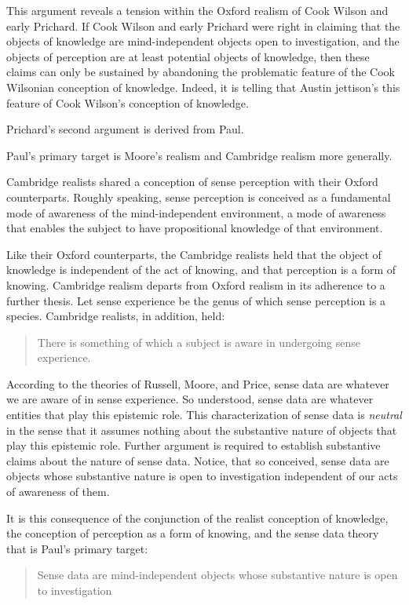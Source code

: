 \documentclass[11pt]{article}
\begin{document}
This argument reveals a tension within the Oxford realism of Cook Wilson and early Prichard. If Cook Wilson and early Prichard were right in claiming that the objects of knowledge are mind-independent objects open to investigation, and the objects of perception are at least potential objects of knowledge, then these claims can only be sustained by abandoning the problematic feature of the Cook Wilsonian conception of knowledge. Indeed, it is telling that Austin jettison's this feature of Cook Wilson's conception of knowledge.

Prichard's second argument is derived from Paul.

Paul's primary target is Moore's realism and Cambridge realism more generally.

Cambridge realists shared a conception of sense perception with their Oxford counterparts. Roughly speaking, sense perception is conceived as a fundamental mode of awareness of the mind-independent environment, a mode of awareness that enables the subject to have propositional knowledge of that environment. 

Like their Oxford counterparts, the Cambridge realists held that the object of knowledge is independent of the act of knowing, and that perception is a form of knowing. Cambridge realism departs from Oxford realism in its adherence to a further thesis. Let sense experience be the genus of which sense perception is a species. Cambridge realists, in addition, held:
\begin{quote}
	There is something of which a subject is aware in undergoing sense experience.
\end{quote}
According to the theories of Russell, Moore, and Price, sense data are whatever we are aware of in sense experience. So understood, sense data are whatever entities that play this epistemic role. This characterization of sense data is \emph{neutral} in the sense that it assumes nothing about the substantive nature of objects that play this epistemic role. Further argument is required to establish substantive claims about the nature of sense data. Notice, that so conceived, sense data are objects whose substantive nature is open to investigation independent of our acts of awareness of them. 

It is this consequence of the conjunction of the realist conception of knowledge, the conception of perception as a form of knowing, and the sense data theory that is Paul's primary target:
\begin{quote}
	Sense data are mind-independent objects whose substantive nature is open to investigation
\end{quote}
\end{document}
